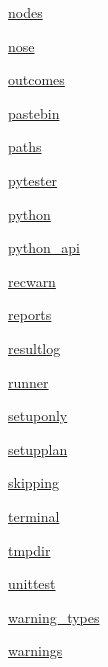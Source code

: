 \begin{DoxyCompactItemize}
 \hyperlink{namespace__pytest_1_1nodes}{nodes}
\item 
 \hyperlink{namespace__pytest_1_1nose}{nose}
\item 
 \hyperlink{namespace__pytest_1_1outcomes}{outcomes}
\item 
 \hyperlink{namespace__pytest_1_1pastebin}{pastebin}
\item 
 \hyperlink{namespace__pytest_1_1paths}{paths}
\item 
 \hyperlink{namespace__pytest_1_1pytester}{pytester}
\item 
 \hyperlink{namespace__pytest_1_1python}{python}
\item 
 \hyperlink{namespace__pytest_1_1python__api}{python\+\_\+api}
\item 
 \hyperlink{namespace__pytest_1_1recwarn}{recwarn}
\item 
 \hyperlink{namespace__pytest_1_1reports}{reports}
\item 
 \hyperlink{namespace__pytest_1_1resultlog}{resultlog}
\item 
 \hyperlink{namespace__pytest_1_1runner}{runner}
\item 
 \hyperlink{namespace__pytest_1_1setuponly}{setuponly}
\item 
 \hyperlink{namespace__pytest_1_1setupplan}{setupplan}
\item 
 \hyperlink{namespace__pytest_1_1skipping}{skipping}
\item 
 \hyperlink{namespace__pytest_1_1terminal}{terminal}
\item 
 \hyperlink{namespace__pytest_1_1tmpdir}{tmpdir}
\item 
 \hyperlink{namespace__pytest_1_1unittest}{unittest}
\item 
 \hyperlink{namespace__pytest_1_1warning__types}{warning\+\_\+types}
\item 
 \hyperlink{namespace__pytest_1_1warnings}{warnings}
\end{DoxyCompactItemize}

